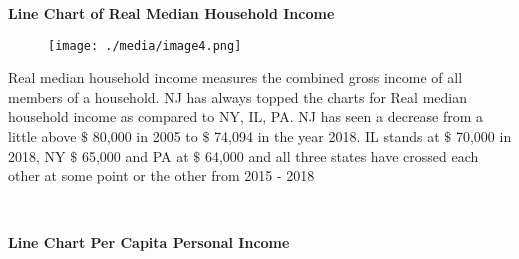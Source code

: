 \documentclass[12pt]{article}
\begin{document}
\vspace{\baselineskip}
\begin{adjustwidth}{1.5in}{0.0in}
\begin{justify}
\textbf{Line Chart of Real Median Household Income}
\end{justify}\par

\end{adjustwidth}




\begin{figure}[H]
\advance\leftskip 0.15in		\texttt{[image: ./media/image4.png]}
\end{figure}



\par

\begin{justify}
Real median household income measures the combined gross income of all members of a household. NJ has always topped the charts for Real median household income as compared to NY, IL, PA. NJ has seen a decrease from a little above $\$$ 80,000 in 2005 to $\$$ 74,094 in the year 2018. IL stands at $\$$ 70,000 in 2018, NY $\$$ 65,000 and PA at $\$$ 64,000 and all three states have crossed each other at some point or the other from 2015 - 2018
\end{justify}\par

\begin{adjustwidth}{1.5in}{0.0in}
\begin{justify}
\textbf{\  }
\end{justify}\par

\end{adjustwidth}


\vspace{\baselineskip}
\begin{adjustwidth}{1.5in}{0.0in}
\begin{justify}
\textbf{ Line Chart Per Capita Personal Income}
\end{justify}\par

\end{adjustwidth}


\vspace{\baselineskip}
\end{document}
